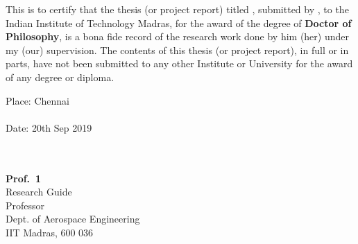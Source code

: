 \certificate

\vspace*{0.5in}

\noindent This is to certify that the thesis (or project report) titled \textbf{\MyTitle}, submitted by \textbf{\MyAuthor}, 
  to the Indian Institute of Technology Madras, for
the award of the degree of \textbf{Doctor of Philosophy}, is a bona fide
record of the research work done by him (her) under my (our) supervision.  The
contents of this thesis (or project report), in full or in parts, have not been submitted
to any other Institute or University for the award of any degree or
diploma.


\vspace*{1.0in}

\begin{singlespacing}
\hspace*{-0.25in}
\parbox{2.5in}{
	\noindent Place: Chennai \\
	\\
	\noindent Date: 20th Sep 2019 \\ 
	\\
	\\
}
\hspace*{1.0in}
\parbox{2.5in}{
	\noindent \textbf{Prof.~1} \\
	\noindent Research Guide \\ %
	\noindent Professor \\
	\noindent Dept. of Aerospace Engineering\\
	\noindent IIT Madras, 600 036 \\
}
\end{singlespacing}

 
